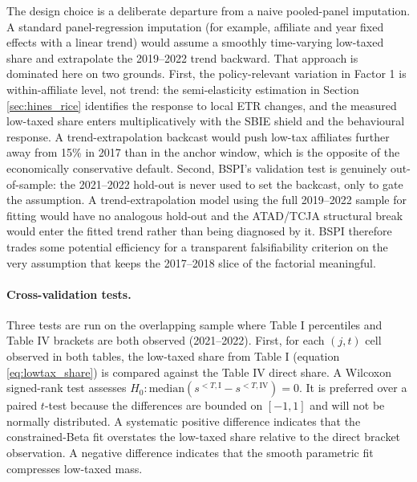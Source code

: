 \documentclass[11pt,a4paper]{article}
\begin{document}
The design choice is a deliberate departure from a naive pooled-panel imputation. A standard panel-regression imputation (for example, affiliate and year fixed effects with a linear trend) would assume a smoothly time-varying low-taxed share and extrapolate the 2019--2022 trend backward. That approach is dominated here on two grounds. First, the policy-relevant variation in Factor 1 is within-affiliate level, not trend: the semi-elasticity estimation in Section \ref{sec:hines_rice} identifies the response to local ETR changes, and the measured low-taxed share enters multiplicatively with the SBIE shield and the behavioural response. A trend-extrapolation backcast would push low-tax affiliates further away from 15\% in 2017 than in the anchor window, which is the opposite of the economically conservative default. Second, BSPI's validation test is genuinely out-of-sample: the 2021--2022 hold-out is never used to set the backcast, only to gate the assumption. A trend-extrapolation model using the full 2019--2022 sample for fitting would have no analogous hold-out and the ATAD/TCJA structural break would enter the fitted trend rather than being diagnosed by it. BSPI therefore trades some potential efficiency for a transparent falsifiability criterion on the very assumption that keeps the 2017--2018 slice of the factorial meaningful.

\paragraph{Cross-validation tests.}\label{sec:crossval_tests}
Three tests are run on the overlapping sample where Table I percentiles and Table IV brackets are both observed (2021--2022). First, for each $(j, t)$ cell observed in both tables, the low-taxed share from Table I (equation \ref{eq:lowtax_share}) is compared against the Table IV direct share. A Wilcoxon signed-rank test assesses $H_0\colon \text{median}(s^{<T,\text{I}} - s^{<T,\text{IV}}) = 0$. It is preferred over a paired $t$-test because the differences are bounded on $[-1, 1]$ and will not be normally distributed. A systematic positive difference indicates that the constrained-Beta fit overstates the low-taxed share relative to the direct bracket observation. A negative difference indicates that the smooth parametric fit compresses low-taxed mass.
\end{document}

